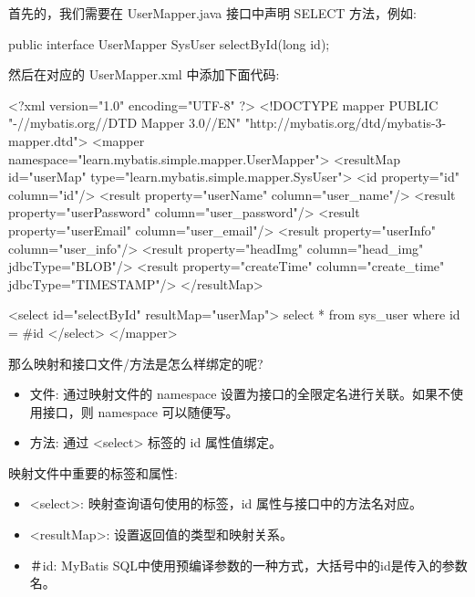 首先的，我们需要在 UserMapper.java 接口中声明 SELECT 方法，例如:
\begin{Java}
public interface UserMapper {
    SysUser selectById(long id);
}
\end{Java}

然后在对应的 UserMapper.xml 中添加下面代码:

\begin{xml}
<?xml version="1.0" encoding="UTF-8" ?>
<!DOCTYPE mapper PUBLIC "-//mybatis.org//DTD Mapper 3.0//EN"
        "http://mybatis.org/dtd/mybatis-3-mapper.dtd">
<mapper namespace="learn.mybatis.simple.mapper.UserMapper">
    <resultMap id="userMap" type="learn.mybatis.simple.mapper.SysUser">
        <id property="id" column="id"/>
        <result property="userName" column="user_name"/>
        <result property="userPassword" column="user_password"/>
        <result property="userEmail" column="user_email"/>
        <result property="userInfo" column="user_info"/>
        <result property="headImg" column="head_img" jdbcType="BLOB"/>
        <result property="createTime" column="create_time" jdbcType="TIMESTAMP"/>
    </resultMap>
    
    <select id="selectById" resultMap="userMap">
        select * from sys_user where id = #{id}
    </select>
</mapper>
\end{xml}

那么映射和接口文件/方法是怎么样绑定的呢?
\begin{itemize}
    \item 文件: 通过映射文件的 namespace 设置为接口的全限定名进行关联。如果不使用接口，则 namespace 可以随便写。
    \item 方法: 通过 <select> 标签的 id 属性值绑定。
\end{itemize}

映射文件中重要的标签和属性:
\begin{itemize}
    \item <select>: 映射查询语句使用的标签，id 属性与接口中的方法名对应。
    \item <resultMap>: 设置返回值的类型和映射关系。
    \item ＃{id}: MyBatis SQL中使用预编译参数的一种方式，大括号中的id是传入的参数名。
\end{itemize}

